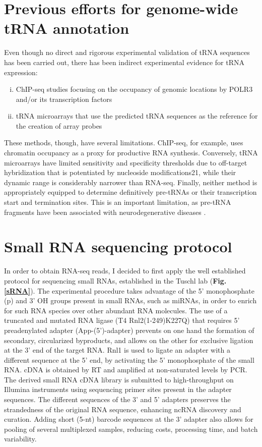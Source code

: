 \documentclass[12pt]{rockefeller}
\begin{document}
\section{Previous efforts for genome-wide tRNA annotation}

Even though no direct and rigorous experimental validation of tRNA sequences has been carried out, there has been indirect experimental evidence for tRNA expression:

\begin{enumerate}[i)]
\item ChIP-seq studies focusing on the occupancy of genomic locations by POLR3 and/or its transcription factors \cite{Moqtaderi:2010hc,Oler:2010fb,Kutter:2011ff}
\item tRNA microarrays that use the predicted tRNA sequences as the reference for the creation of array probes \cite{Dittmar:2004fb}
\end{enumerate}

These methods, though, have several limitations. ChIP-seq, for example, uses chromatin occupancy as a proxy for productive RNA synthesis. Conversely, tRNA microarrays have limited sensitivity and specificity thresholds due to off-target hybridization that is potentiated by nucleoside modifications21, while their dynamic range is considerably narrower than RNA-seq. Finally, neither method is appropriately equipped to determine definitively pre-tRNAs or their transcription start and termination sites. This is an important limitation, as pre-tRNA fragments have been associated with neurodegenerative diseases \cite{Hanada:2013bk, Weitzer:2014bi, Karaca:2014em}. 
	
\section{Small RNA sequencing protocol}
In order to obtain RNA-seq reads, I decided to first apply the well established protocol for sequencing small RNAs, established in the Tuschl lab \cite{Hafner:2012eaa} (\textbf{Fig. \ref{sRNA}}). The experimental procedure takes advantage of the 5' monophosphate (p) and 3' OH groups present in small RNAs, such as \glspl{miRNA}, in order to enrich for such RNA species over other abundant RNA molecules. The use of a truncated and mutated RNA ligase (T4 Rnl2(1-249)K227Q) that requires 5' preadenylated adapter (App-(5')-adapter) prevents on one hand the formation of secondary, circularized byproducts, and allows on the other for exclusive ligation at the 3' end of the target RNA. Rnl1 is used to ligate an adapter with a different sequence at the 5' end, by activating the 5' monophosphate of the small RNA. cDNA is obtained by RT and amplified at non-saturated levels by PCR. The derived small RNA cDNA library is submitted to high-throughput on Illumina instruments using sequencing primer sites present in the adapter sequences. The different sequences of the 3' and 5' adapters preserves the strandedness of the original RNA sequence, enhancing ncRNA discovery and curation. Adding short (5-nt) barcode sequences at the 3' adapter also allows for pooling of several multiplexed samples, reducing costs, processing time, and batch variability. 
\end{document}

